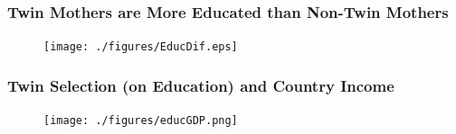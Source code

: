 \documentclass[9pt,letterpaper,subeqn]{beamer}
\begin{document}

\begin{frame}[label=EducTwin]
\frametitle{Twin Mothers are More Educated than Non-Twin Mothers}
\begin{figure}[htpb!]
\centering
  \texttt{[image: ./figures/EducDif.eps]}
\end{figure}
\hyperlink{HealthTwin}{}
\end{frame}

\begin{frame}[label=EducGDP]
\frametitle{Twin Selection (on Education) and Country Income}
\begin{figure}[htpb!]
\centering
  \texttt{[image: ./figures/educGDP.png]}
\end{figure}
\hyperlink{HealthGDP}{}
\end{frame}

\end{document}
